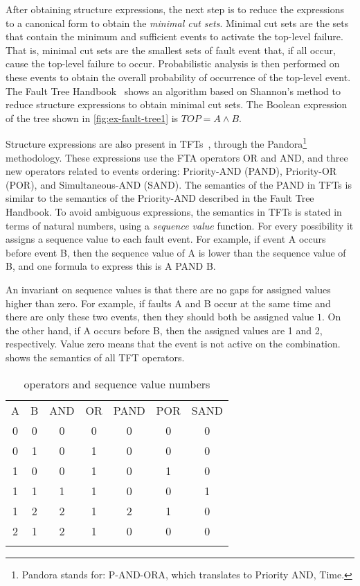 \documentclass[en,twoside,onehalfspacing,phd]{risethesis}
\def\FThandbook{Fault Tree Handbook~\cite{VGR+1981}\index{Fault Tree!Handbook}%
  \gdef\FThandbook{Fault Tree Handbook\index{Fault Tree!Handbook}\xspace}%
  \xspace}
\def\pandora{Pandora\footnote{Pandora stands for: P-AND-ORA, which translates to Priority AND, Time.}%
  \gdef\pandora{Pandora\xspace}%
  \xspace}
\begin{document}
After obtaining structure expressions, the next step is to reduce the expressions to a canonical form to obtain the \emph{minimal cut sets}.
Minimal cut sets are the sets that contain the minimum and sufficient events to activate the top-level failure.
That is, minimal cut sets are the smallest sets of fault event that, if all occur, cause the top-level failure to occur.
Probabilistic analysis is then performed on these events to obtain the overall probability of occurrence of the top-level event.
The \FThandbook shows an algorithm based on Shannon's method to reduce structure expressions to obtain minimal cut sets.
The Boolean expression of the tree shown in \cref{fig:ex-fault-tree1} is $TOP = A \wedge B$.

Structure expressions are also present in \acp{TFT}~\cite{WP2009,Walker2009,WP2010}, through the \pandora methodology.
These expressions use the \ac{FTA} operators OR and AND, and three new operators related to events ordering: Priority-AND (PAND), Priority-OR (POR), and Simultaneous-AND (SAND).
The semantics of the PAND in \acp{TFT} is similar to the semantics of the Priority-AND described in the \FThandbook.
To avoid ambiguous expressions, the semantics in \acp{TFT} is stated in terms of natural numbers, using a \emph{sequence value} function.
For every possibility it assigns a sequence value to each fault event.
For example, if event A occurs before event B, then the sequence value of A is lower than the sequence value of B, and one formula to express this is A PAND B.

An invariant on sequence values is that there are no gaps for assigned values higher than zero.
For example, if faults A and B occur at the same time and there are only these two events, then they should both be assigned value $1$.
On the other hand, if A occurs before B, then the assigned values are 1 and 2, respectively.
Value zero means that the event is not active on the combination.
 shows the semantics of all \ac{TFT} operators.

\begin{table}
\caption{ operators and sequence value numbers}
\label{tbl:tft-operators}
\begin{tabular}{ccccccc}
\hline\noalign{\smallskip}
A & B & AND & OR & PAND & POR & SAND  \\
\noalign{\smallskip}\hline\noalign{\smallskip}
0 & 0 & 0 & 0 & 0 & 0 & 0\\
0 & 1 & 0 & 1 & 0 & 0 & 0\\
1 & 0 & 0 & 1 & 0 & 1 & 0\\
1 & 1 & 1 & 1 & 0 & 0 & 1\\
1 & 2 & 2 & 1 & 2 & 1 & 0\\
2 & 1 & 2 & 1 & 0 & 0 & 0\\
\noalign{\smallskip}\hline
\end{tabular}
\end{table}
\end{document}
